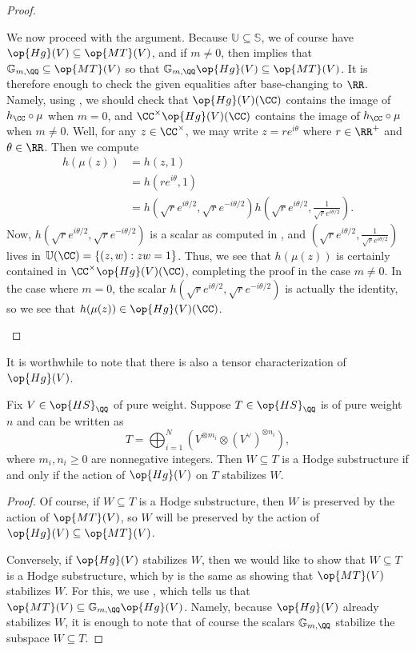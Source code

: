 \documentclass[../thesis.tex]{subfiles}
\begin{document}
\begin{proof}
\begin{listalph}
		We now proceed with the argument. Because $\mathbb U\subseteq\mathbb S$, we of course have $\op{Hg}(V)\subseteq\op{MT}(V)$, and if $m\ne0$, then  implies that $\mathbb G_{m,\QQ}\subseteq\op{MT}(V)$ so that $\mathbb G_{m,\QQ}\op{Hg}(V)\subseteq\op{MT}(V)$. It is therefore enough to check the given equalities after base-changing to $\RR$. Namely, using , we should check that $\op{Hg}(V)(\CC)$ contains the image of $h_\CC\circ\mu$ when $m=0$, and $\CC^\times\op{Hg}(V)(\CC)$ contains the image of $h_\CC\circ\mu$ when $m\ne0$. Well, for any $z\in\CC^\times$, we may write $z=re^{i\theta}$ where $r\in\RR^+$ and $\theta\in\RR$. Then we compute
		\begin{align*}
			h(\mu(z)) &= h(z,1) \\
			&= h\left(re^{i\theta},1\right) \\
			&= h\left(\sqrt re^{i\theta/2},\sqrt re^{-i\theta/2}\right)h\left(\sqrt re^{i\theta/2},\frac1{\sqrt re^{i\theta/2}}\right).
		\end{align*}
		Now, $h\left(\sqrt re^{i\theta/2},\sqrt re^{-i\theta/2}\right)$ is a scalar as computed in , and $\left(\sqrt re^{i\theta/2},\frac1{\sqrt re^{i\theta/2}}\right)$ lives in $\mathbb U(\CC)=\{(z,w):zw=1\}$. Thus, we see that $h(\mu(z))$ is certainly contained in $\CC^\times\op{Hg}(V)(\CC)$, completing the proof in the case $m\ne0$. In the case where $m=0$, the scalar $h\left(\sqrt re^{i\theta/2},\sqrt re^{-i\theta/2}\right)$ is actually the identity, so we see that $h(\mu(z))\in\op{Hg}(V)(\CC)$.
		\qedhere
	\end{listalph}
\end{proof}
It is worthwhile to note that there is also a tensor characterization of $\op{Hg}(V)$.
\begin{proposition} \label{prop:tensors-of-hg}
	Fix $V\in\op{HS}_\QQ$ of pure weight. Suppose $T\in\op{HS}_\QQ$ is of pure weight $n$ and can be written as
	\[T=\bigoplus_{i=1}^N\left(V^{\otimes m_i}\otimes (V^\lor)^{\otimes n_i}\right),\]
	where $m_i,n_i\ge0$ are nonnegative integers. Then $W\subseteq T$ is a Hodge substructure if and only if the action of $\op{Hg}(V)$ on $T$ stabilizes $W$.
\end{proposition}
\begin{proof}
	Of course, if $W\subseteq T$ is a Hodge substructure, then $W$ is preserved by the action of $\op{MT}(V)$, so $W$ will be preserved by the action of $\op{Hg}(V)\subseteq\op{MT}(V)$.
	
	Conversely, if $\op{Hg}(V)$ stabilizes $W$, then we would like to show that $W\subseteq T$ is a Hodge substructure, which by  is the same as showing that $\op{MT}(V)$ stabilizes $W$. For this, we use , which tells us that $\op{MT}(V)\subseteq\mathbb G_{m,\QQ}\op{Hg}(V)$. Namely, because $\op{Hg}(V)$ already stabilizes $W$, it is enough to note that of course the scalars $\mathbb G_{m,\QQ}$ stabilize the subspace $W\subseteq T$.
\end{proof}
\end{document}

